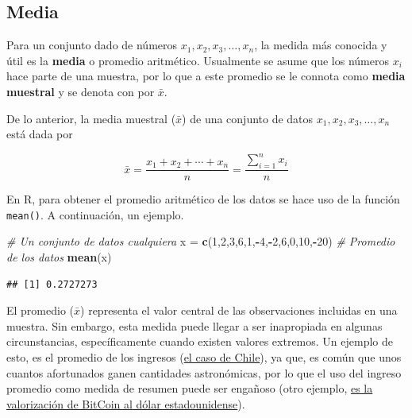 \documentclass[
  11pt,
]{book}
\newenvironment{Shaded}{\begin{snugshade}}{\end{snugshade}}
\newcommand{\CommentTok}[1]{\textcolor[rgb]{0.56,0.35,0.01}{\textit{#1}}}
\newcommand{\DecValTok}[1]{\textcolor[rgb]{0.00,0.00,0.81}{#1}}
\newcommand{\FunctionTok}[1]{\textcolor[rgb]{0.13,0.29,0.53}{\textbf{#1}}}
\newcommand{\NormalTok}[1]{#1}
\newcommand{\OtherTok}[1]{\textcolor[rgb]{0.56,0.35,0.01}{#1}}
\newcommand{\SpecialCharTok}[1]{\textcolor[rgb]{0.81,0.36,0.00}{\textbf{#1}}}
\theoremstyle{definition}
\theoremstyle{definition}
\theoremstyle{definition}
\theoremstyle{definition}
\theoremstyle{remark}
\begin{document}
\subsection{Media}\label{topicos-medidas-localizacion-media}

Para un conjunto dado de números \(x_1, x_2, x_3, \ldots, x_n\), la medida más conocida y útil es la \textbf{media} o promedio aritmético. Usualmente se asume que los números \(x_i\) hace parte de una muestra, por lo que a este promedio se le connota como \textbf{media muestral} y se denota con por \(\bar{x}\).

De lo anterior, la media muestral (\(\bar{x}\)) de una conjunto de datos \(x_1, x_2, x_3, \ldots, x_n\) está dada por \citep[página 25]{Devore}

\begin{equation}
\bar{x} = \frac{x_1 + x_2 + \cdots + x_n}{n} = \frac{\displaystyle\sum_{i=1}^{n}x_i}{n}
\label{eq:promedio}
\end{equation}

En R, para obtener el promedio aritmético de los datos se hace uso de la función \texttt{mean()}. A continuación, un ejemplo.

\begin{Shaded}
\begin{Highlighting}[]
\CommentTok{\# Un conjunto de datos cualquiera}
\NormalTok{x }\OtherTok{=} \FunctionTok{c}\NormalTok{(}\DecValTok{1}\NormalTok{,}\DecValTok{2}\NormalTok{,}\DecValTok{3}\NormalTok{,}\DecValTok{6}\NormalTok{,}\DecValTok{1}\NormalTok{,}\SpecialCharTok{{-}}\DecValTok{4}\NormalTok{,}\SpecialCharTok{{-}}\DecValTok{2}\NormalTok{,}\DecValTok{6}\NormalTok{,}\DecValTok{0}\NormalTok{,}\DecValTok{10}\NormalTok{,}\SpecialCharTok{{-}}\DecValTok{20}\NormalTok{)}
\CommentTok{\# Promedio de los datos}
\FunctionTok{mean}\NormalTok{(x)}
\end{Highlighting}
\end{Shaded}

\begin{verbatim}
## [1] 0.2727273
\end{verbatim}

El promedio (\(\bar{x}\)) representa el valor central de las observaciones incluidas en una muestra. Sin embargo, esta medida puede llegar a ser inapropiada en algunas circunstancias, específicamente cuando existen valores extremos. Un ejemplo de esto, es el promedio de los ingresos (\href{https://www.ine.gob.cl/prensa/detalle-prensa/2022/07/21/el-ingreso-laboral-promedio-mensual-en-chile-fue-de-$681.039-en-2021\#:~:text=El\%20ingreso\%20laboral\%20promedio\%20mensual\%20en\%20Chile\%20fue\%20de\%20\%24681.039\%20en\%202021,-21\%2F07\%2F2022&text=El\%2050\%25\%20de\%20las\%20personas,ingreso\%20de\%20hasta\%20\%24457.690\%20mensuales.}{el caso de Chile}), ya que, es común que unos cuantos afortunados ganen cantidades astronómicas, por lo que el uso del ingreso promedio como medida de resumen puede ser engañoso (otro ejemplo, \href{https://www.google.com/finance/quote/BTC-USD?sa=X&ved=2ahUKEwi3po-_m9n8AhWUL7kGHTNFCfYQ-fUHegQIFhAe&window=MAX}{es la valorización de BitCoin al dólar estadounidense}).
\end{document}
